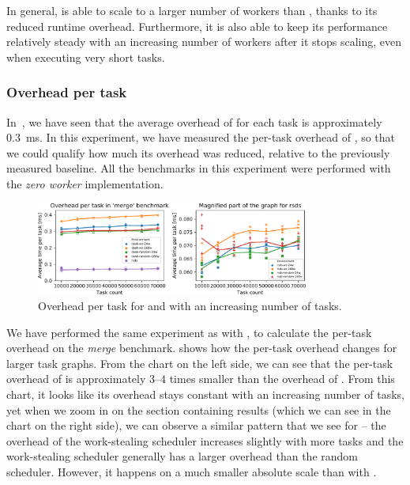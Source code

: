In general, \rsds{} is able to scale to a larger number of workers than
\dask{}, thanks to its reduced runtime overhead. Furthermore, it is also able
to keep its performance relatively steady with an increasing number of workers after it stops
scaling, even when executing very short tasks.

\subsubsection*{Overhead per task}
In~, we have seen that the average overhead of
\dask{} for each task is approximately \SI{0.3}{\milli\second}. In this
experiment, we have measured the per-task overhead of \rsds{}, so that we could
qualify how much its overhead was reduced, relative to the previously measured baseline. All the
benchmarks in this experiment were performed with the \emph{zero worker} implementation.

\begin{figure}
	\centering
	\includegraphics[width=0.8\textwidth]{./imgs/rsds/charts/rsds-merge-task-scaling}
	\caption{Overhead per task for \rsds{} and \dask{} with an
	increasing number of tasks.}
	\label{fig:rsds-merge-task-scaling}
\end{figure}

We have performed the same experiment as with \dask{}, to calculate the
per-task overhead on the \emph{merge} benchmark.  shows
how the per-task overhead changes for larger task graphs. From the chart on the left side, we can
see that the per-task overhead of \rsds{} is approximately
$3$--$4$ times smaller than the overhead of
\dask{}. From this chart, it looks like its overhead stays constant with an
increasing number of tasks, yet when we zoom in on the section containing
\rsds{} results (which we can see in the chart on the right side), we can
observe a similar pattern that we see for \dask{} -- the overhead of the
work-stealing scheduler increases slightly with more tasks and the work-stealing scheduler
generally has a larger overhead than the random scheduler. However, it happens on a much smaller
absolute scale than with \dask{}.

